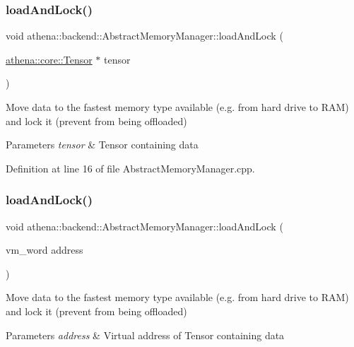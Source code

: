 \subsubsection{\texorpdfstring{load\+And\+Lock()}{loadAndLock()}\hspace{0.1cm}{\footnotesize\ttfamily [1/3]}}
{\footnotesize\ttfamily void athena\+::backend\+::\+Abstract\+Memory\+Manager\+::load\+And\+Lock (\begin{DoxyParamCaption}\item[{\mbox{\hyperlink{classathena_1_1core_1_1_tensor}{athena\+::core\+::\+Tensor}} $\ast$}]{tensor }\end{DoxyParamCaption})}

Move data to the fastest memory type available (e.\+g. from hard drive to R\+AM) and lock it (prevent from being offloaded) 
\begin{DoxyParams}{Parameters}
{\em tensor} & Tensor containing data \\
\hline
\end{DoxyParams}


Definition at line 16 of file Abstract\+Memory\+Manager.\+cpp.

\mbox{\label{classathena_1_1backend_1_1_abstract_memory_manager_a47ea5a77f81f91f803f748720c5c19b5}} 
\subsubsection{\texorpdfstring{load\+And\+Lock()}{loadAndLock()}\hspace{0.1cm}{\footnotesize\ttfamily [2/3]}}
{\footnotesize\ttfamily void athena\+::backend\+::\+Abstract\+Memory\+Manager\+::load\+And\+Lock (\begin{DoxyParamCaption}\item[{vm\+\_\+word}]{address }\end{DoxyParamCaption})}

Move data to the fastest memory type available (e.\+g. from hard drive to R\+AM) and lock it (prevent from being offloaded) 
\begin{DoxyParams}{Parameters}
{\em address} & Virtual address of Tensor containing data \\
\hline
\end{DoxyParams}


